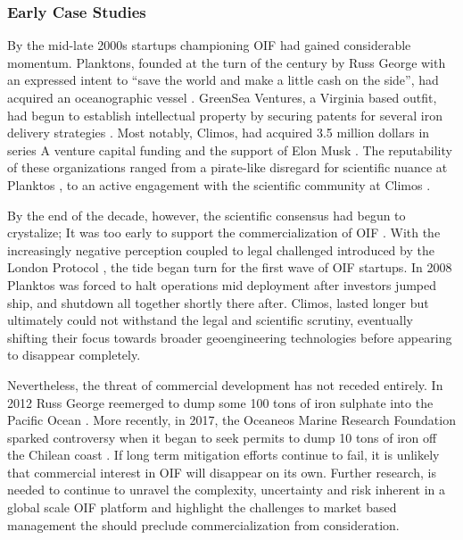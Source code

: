 \subsubsection{Early Case Studies}

By the mid-late 2000s startups championing OIF had gained considerable momentum. Planktons, founded at the turn of the century by Russ George with an expressed intent to “save the world and make a little cash on the side”, had acquired an oceanographic vessel \parencite{GoodellLittleCashSide2011b}. GreenSea Ventures, a Virginia based outfit, had begun to establish intellectual property by securing patents for several iron delivery strategies \parencite{BowiePositionanalysisocean2016}. Most notably, Climos, had acquired 3.5 million dollars in series A venture capital funding and the support of Elon Musk \parencite{NewPlanktonSeedingVenture2008}. The reputability of these organizations ranged from a pirate-like disregard for scientific nuance at Planktos \parencite{GoodellLittleCashSide2011b}, to an active engagement with the scientific community at Climos \parencite{LeinenBuildingrelationshipsscientists2008}.

By the end of the decade, however, the scientific consensus had begun to crystalize; It was too early to support the commercialization of OIF \parencite{BuesselerOceanIronFertilization2008}. With the increasingly negative perception coupled to legal challenged introduced by the London Protocol \parencite{ResolutionLCLPRegulation2008}, the tide began turn for the first wave of OIF startups. In 2008 Planktos was forced to halt operations mid deployment after investors jumped ship, and shutdown all together shortly there after. Climos, lasted longer but ultimately could not withstand the legal and scientific scrutiny, eventually shifting their focus towards broader geoengineering technologies \parencite{GoodellLittleCashSide2011c} before appearing to disappear completely.  

Nevertheless, the threat of commercial development has not receded entirely. In 2012 Russ George reemerged to dump some 100 tons of iron sulphate into the Pacific Ocean \parencite{LukacsWorldbiggestgeoengineering2012}. More recently, in 2017, the Oceaneos Marine Research Foundation sparked controversy when it began to seek permits to dump 10 tons of iron off the Chilean coast \parencite{TollefsonIronDumpingOceanExperiment2017}.  If long term mitigation efforts continue to fail, it is unlikely that commercial interest in OIF will disappear on its own. Further research, is needed to continue to unravel the complexity, uncertainty and risk inherent in a global scale OIF platform and highlight the challenges to market based management the should preclude commercialization from consideration.  


